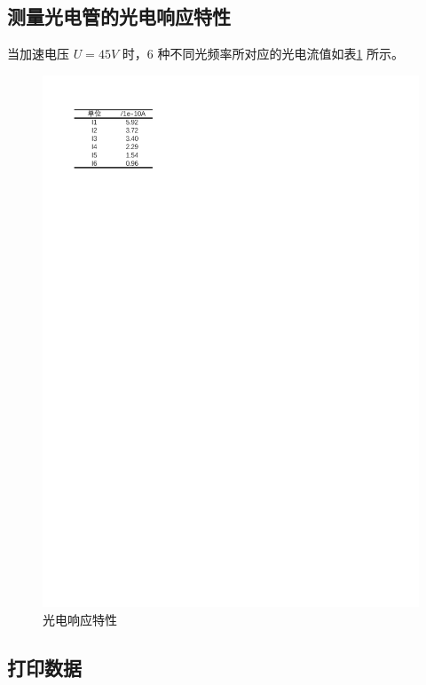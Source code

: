 \documentclass[12pt]{article}
\begin{document}
\subsection{\normalfont 测量光电管的光电响应特性}

当加速电压 $U = 45 V$ 时，6 种不同光频率所对应的光电流值如表\ref{fig:table_data2} 所示。

\begin{figure}[H] %
    \centering
    \includegraphics[width=\textwidth]{./figures/光电相应特性.pdf} 
    \caption{光电响应特性}
    \label{fig:table_data2}
\end{figure}

\subsection{\normalfont 打印数据}
\end{document}
